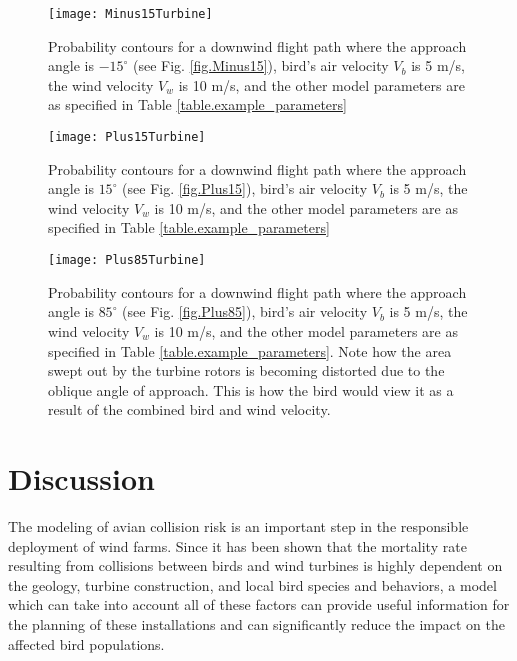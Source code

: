 \label{} \documentclass[10pt,conference]{IEEEtran}
\begin{document}
\begin{figure}
   \centering
   \texttt{[image: Minus15Turbine]}
   \caption{Probability contours for a downwind flight path where the approach angle is $-15^\circ$ (see Fig. \ref{fig.Minus15}), bird's air velocity $V_b$ is 5
m/s, the wind velocity $V_w$ is 10 m/s, and the other model parameters are as specified in Table
\ref{table.example_parameters}}
   \label{fig.Minus15Turbine}
   \end{figure}

\begin{figure}
   \centering
   \texttt{[image: Plus15Turbine]}
   \caption{Probability contours for a downwind flight path where the approach angle is $15^\circ$ (see Fig. \ref{fig.Plus15}), bird's air velocity $V_b$ is 5
m/s, the wind velocity $V_w$ is 10 m/s, and the other model parameters are as specified in Table
\ref{table.example_parameters}}
   \label{fig.Plus15Turbine}
   \end{figure}

\begin{figure}
   \centering
   \texttt{[image: Plus85Turbine]}
   \caption{Probability contours for a downwind flight path where the approach angle is $85^\circ$ (see Fig. \ref{fig.Plus85}), bird's air velocity $V_b$ is 5
m/s, the wind velocity $V_w$ is 10 m/s, and the other model parameters are as specified in Table
\ref{table.example_parameters}. Note how the area swept out by the turbine rotors is becoming distorted due to the
oblique angle of approach. This is how the bird would view it as a result of the combined bird and wind velocity.}
   \label{fig.Plus85Turbine}
   \end{figure}



\section{Discussion}
The modeling of avian collision risk is an important step in the responsible deployment of wind farms. Since it has
been shown that the mortality rate resulting from collisions between birds and wind turbines is highly dependent on the
geology, turbine construction, and local bird species and behaviors, a model which can take into account all of these
factors can provide useful information for the planning of these installations and can significantly reduce the impact
on the affected bird populations.
\end{document}
